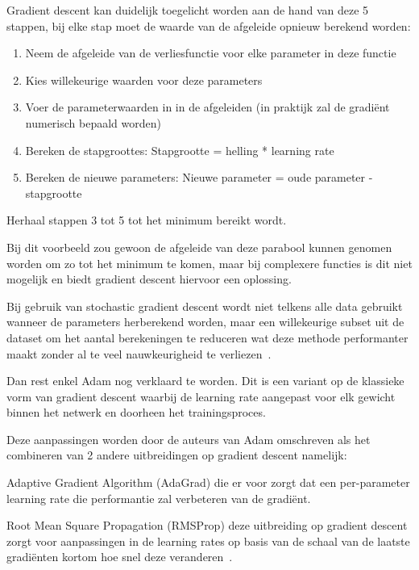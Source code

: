 Gradient descent kan duidelijk toegelicht worden aan de hand van deze 5 stappen, bij elke stap moet de waarde van de afgeleide opnieuw berekend worden:
\begin{enumerate}
    \item Neem de afgeleide van de verliesfunctie voor elke parameter in deze functie
    \item Kies willekeurige waarden voor deze parameters
    \item Voer de parameterwaarden in in de afgeleiden (in praktijk zal de gradi\"{e}nt numerisch bepaald worden)
    \item Bereken de stapgroottes: Stapgrootte = helling * learning rate 
    \item Bereken de nieuwe parameters: Nieuwe parameter = oude parameter - stapgrootte
\end{enumerate}

Herhaal stappen 3 tot 5 tot het minimum bereikt wordt.

Bij dit voorbeeld zou gewoon de afgeleide van deze parabool kunnen genomen worden om zo tot het minimum te komen, maar bij complexere functies is dit niet mogelijk en biedt gradient descent hiervoor een oplossing.

Bij gebruik van stochastic gradient descent wordt niet telkens alle data gebruikt wanneer de parameters herberekend worden, maar een willekeurige subset uit de dataset om het aantal berekeningen te reduceren wat deze methode performanter maakt zonder al te veel nauwkeurigheid te verliezen~\autocite{Starmer2019}.

Dan rest enkel Adam nog verklaard te worden. Dit is een variant op de klassieke vorm van gradient descent waarbij de learning rate aangepast voor elk gewicht binnen het netwerk en doorheen het trainingsproces.

Deze aanpassingen worden door de auteurs van Adam omschreven als het combineren van 2 andere uitbreidingen op gradient descent namelijk:

Adaptive Gradient Algorithm (AdaGrad) die er voor zorgt dat een per-parameter learning rate die performantie zal verbeteren van de gradi\"{e}nt.  

Root Mean Square Propagation (RMSProp)  deze uitbreiding op gradient descent zorgt voor aanpassingen in de learning rates op basis van de schaal van de laatste gradi\"{e}nten kortom hoe snel deze veranderen~\autocite{Brownlee2017}.


